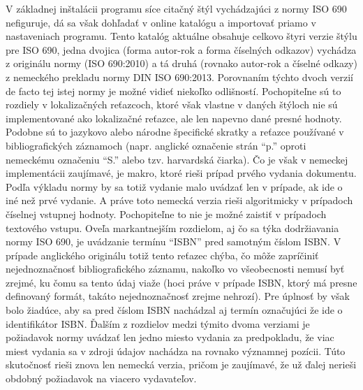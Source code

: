 \documentclass{fithesis3}
\begin{document}
	V základnej inštalácii programu síce citačný štýl vychádzajúci z normy ISO 690 nefiguruje, dá sa však dohľadať v online katalógu a importovať priamo v nastaveniach programu. Tento katalóg aktuálne obsahuje celkovo štyri verzie štýlu pre ISO 690, jedna dvojica (forma autor-rok a forma číselných odkazov) vychádza z originálu normy (ISO 690:2010) a tá druhá (rovnako autor-rok a číselné odkazy) z nemeckého prekladu normy DIN ISO 690:2013. Porovnaním týchto dvoch verzií de facto tej istej normy je možné vidieť niekoľko odlišností. Pochopiteľne sú to rozdiely v lokalizačných reťazcoch, ktoré však vlastne v daných štýloch nie sú implementované ako lokalizačné reťazce, ale len napevno dané presné hodnoty. Podobne sú to jazykovo alebo národne špecifické skratky a reťazce používané v bibliografických záznamoch (napr. anglické označenie strán “p.” oproti nemeckému označeniu “S.” alebo tzv. harvardská čiarka).
	Čo je však v nemeckej implementácii zaujímavé, je makro, ktoré rieši prípad prvého vydania dokumentu. Podľa výkladu normy by sa totiž vydanie malo uvádzať len v prípade, ak ide o iné než prvé vydanie. A práve toto nemecká verzia rieši algoritmicky v prípadoch číselnej vstupnej hodnoty. Pochopiteľne to nie je možné zaistiť v prípadoch textového vstupu.
	Oveľa markantnejším rozdielom, aj čo sa týka dodržiavania normy ISO 690, je uvádzanie termínu “ISBN” pred samotným číslom ISBN. V prípade anglického originálu totiž tento reťazec chýba, čo môže zapríčiniť nejednoznačnosť bibliografického záznamu, nakoľko vo všeobecnosti nemusí byť zrejmé, ku čomu sa tento údaj viaže (hoci práve v prípade ISBN, ktorý má presne definovaný formát, takáto nejednoznačnosť zrejme nehrozí). Pre úplnosť by však bolo žiadúce, aby sa pred číslom ISBN nachádzal aj termín označujúci že ide o identifikátor ISBN.
	Ďalším z rozdielov medzi týmito dvoma verziami je požiadavok normy uvádzať len jedno miesto vydania za predpokladu, že viac miest vydania sa v zdroji údajov nachádza na rovnako významnej pozícii. Túto skutočnosť rieši znova len nemecká verzia, pričom je zaujímavé, že už ďalej nerieši obdobný požiadavok na viacero vydavateľov.
\end{document}
